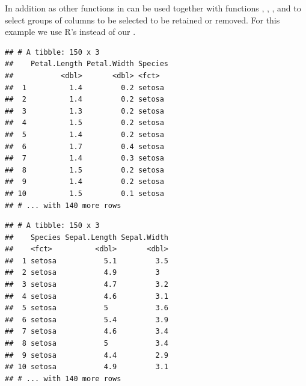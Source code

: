 \documentclass[krantz2]{krantz}\usepackage{knitr}%
\begin{document}
In addition  as other functions in  can be used together with functions , , , and  to select groups of columns to be selected to be retained or removed. For this example we use R's  instead of our .

\begin{knitrout}\footnotesize
{}\color{fgcolor}\begin{kframe}
\begin{alltt}
 \hlopt{-}\hlstd{(}\hlstd{))}
\end{alltt}
\begin{verbatim}
## # A tibble: 150 x 3
##    Petal.Length Petal.Width Species
##           <dbl>       <dbl> <fct>  
##  1          1.4         0.2 setosa 
##  2          1.4         0.2 setosa 
##  3          1.3         0.2 setosa 
##  4          1.5         0.2 setosa 
##  5          1.4         0.2 setosa 
##  6          1.7         0.4 setosa 
##  7          1.4         0.3 setosa 
##  8          1.5         0.2 setosa 
##  9          1.4         0.2 setosa 
## 10          1.5         0.1 setosa 
## # ... with 140 more rows
\end{verbatim}
\end{kframe}
\end{knitrout}

\begin{knitrout}\footnotesize
{}\color{fgcolor}\begin{kframe}
\begin{alltt}
 \hlstd{(}\hlstd{))}
\end{alltt}
\begin{verbatim}
## # A tibble: 150 x 3
##    Species Sepal.Length Sepal.Width
##    <fct>          <dbl>       <dbl>
##  1 setosa           5.1         3.5
##  2 setosa           4.9         3  
##  3 setosa           4.7         3.2
##  4 setosa           4.6         3.1
##  5 setosa           5           3.6
##  6 setosa           5.4         3.9
##  7 setosa           4.6         3.4
##  8 setosa           5           3.4
##  9 setosa           4.4         2.9
## 10 setosa           4.9         3.1
## # ... with 140 more rows
\end{verbatim}
\end{kframe}
\end{knitrout}
\end{document}
